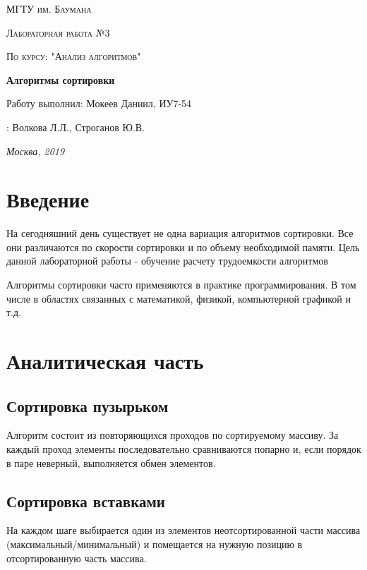\documentclass[12pt]{report}
\begin{document}
\begin{titlepage}
	\centering
	{\scshape\LARGE МГТУ им. Баумана \par}
	\vspace{3cm}
	{\scshape\Large Лабораторная работа №3\par}
	\vspace{0.5cm}	
	{\scshape\Large По курсу: "Анализ алгоритмов"\par}
	\vspace{1.5cm}
	{\huge\bfseries Алгоритмы сортировки\par}
	\vspace{2cm}
	\Large Работу выполнил: Мокеев Даниил, ИУ7-54\par
	\vspace{0.5cm}
	:  Волкова Л.Л., Строганов Ю.В.\par

	\vfill
	\large \textit {Москва, 2019} \par
\end{titlepage}

\tableofcontents

\newpage
\chapter*{Введение}

На сегодняшний день существует не одна вариация алгоритмов сортировки. Все они различаются по скорости сортировки и по объему необходимой памяти. 
Цель данной лабораторной работы - обучение расчету трудоемкости алгоритмов

Алгоритмы сортировки часто применяются в практике программирования. В том числе в областях связанных с математикой, физикой, компьютерной графикой и т.д.

\chapter{Аналитическая часть}
\section{Сортировка пузырьком}
Алгоритм состоит из повторяющихся проходов по сортируемому массиву. За каждый проход элементы последовательно сравниваются попарно и, если порядок в паре неверный, выполняется обмен элементов.

\section{Сортировка вставками}
На каждом шаге выбирается один из элементов неотсортированной части массива (максимальный/минимальный) 
и помещается на нужную позицию в отсортированную часть массива. 
\end{document}
